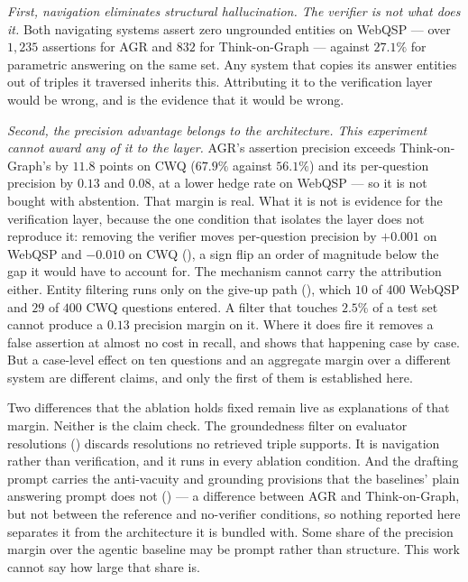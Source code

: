\emph{First, navigation eliminates structural hallucination. The verifier is
not what does it.} Both navigating systems assert zero ungrounded entities on
WebQSP --- over $1{,}235$ assertions for AGR and $832$ for Think-on-Graph ---
against $27.1\%$ for parametric answering on the same set. Any system that
copies its answer entities out of triples it traversed inherits this.
Attributing it to the verification layer would be wrong, and
 is the evidence that it would be wrong.

\emph{Second, the precision advantage belongs to the architecture. This
experiment cannot award any of it to the layer.} AGR's assertion precision
exceeds Think-on-Graph's by $11.8$ points on CWQ ($67.9\%$ against $56.1\%$) and
its per-question precision by $0.13$ and $0.08$, at a lower hedge rate on WebQSP
--- so it is not bought with abstention. That margin is real. What it is not is
evidence for the verification layer, because the one condition that isolates the
layer does not reproduce it: removing the verifier moves per-question precision
by $+0.001$ on WebQSP and $-0.010$ on CWQ (), a sign flip an
order of magnitude below the gap it would have to account for. The mechanism
cannot carry the attribution either. Entity filtering runs only on the give-up
path (), which $10$ of $400$ WebQSP and $29$ of $400$
CWQ questions entered. A filter that touches $2.5\%$ of a test set cannot
produce a $0.13$ precision margin on it. Where it does fire it removes a false
assertion at almost no cost in recall, and 
shows that happening case by case. But a case-level effect on ten questions
and an aggregate margin over a different system are different claims, and only
the first of them is established here.

Two differences that the ablation holds fixed remain live as explanations of
that margin. Neither is the claim check. The groundedness filter on
evaluator resolutions () discards resolutions no
retrieved triple supports. It is navigation rather than verification, and it
runs in every ablation condition. And the drafting prompt carries the
anti-vacuity and grounding provisions that the baselines' plain answering prompt
does not () --- a difference between AGR and
Think-on-Graph, but not between the reference and no-verifier conditions, so
nothing reported here separates it from the architecture it is bundled with.
Some share of the precision margin over the agentic baseline may be prompt
rather than structure. This work cannot say how large that share is.

